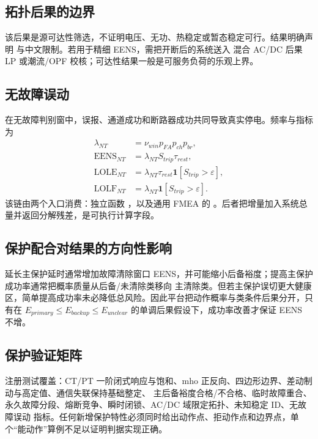 \subsection{拓扑后果的边界}
该后果是源可达性筛选，不证明电压、无功、热稳定或暂态稳定可行。结果明确声明
 与中文限制。若用于精细 EENS，需把开断后的系统送入
混合 AC/DC 后果 LP 或潮流/OPF 校核；可达性结果一般是可服务负荷的乐观上界。

\subsection{无故障误动}
在无故障判别窗中，误报、通道成功和断路器成功共同导致真实停电。频率与指标为
\begin{align}
 \lambda_{NT}&=\nu_{win}p_{FA}p_{ch}p_{br},\\
 \mathrm{EENS}_{NT}&=\lambda_{NT}S_{trip}\tau_{rest},\\
 \mathrm{LOLE}_{NT}&=\lambda_{NT}\tau_{rest}\mathbf1[S_{trip}>\varepsilon],\\
 \mathrm{LOLF}_{NT}&=\lambda_{NT}\mathbf1[S_{trip}>\varepsilon].
\end{align}
该链由两个入口消费：独立函数
，以及通用 FMEA 的
。后者把增量加入系统总量并返回分解残差，是可执行计算字段。

\subsection{保护配合对结果的方向性影响}
延长主保护延时通常增加故障清除窗口 EENS，并可能缩小后备裕度；提高主保护成功率通常把概率质量从后备/未清除类移向
主清除类。但若主保护误切更大健康区，简单提高成功率未必降低总风险。因此平台把动作概率与类条件后果分开，只有在
$E_{primary}\le E_{backup}\le E_{unclear}$ 的单调后果假设下，成功率改善才保证 EENS 不增。

\subsection{保护验证矩阵}
注册测试覆盖：CT/PT 一阶闭式响应与饱和、mho 正反向、四边形边界、差动制动与高定值、通信失联保持基础整定、
主后备裕度合格/不合格、临时故障重合、永久故障分段、熔断竞争、瞬时闭锁、AC/DC 域限定拓扑、未知稳定 ID、无故障误动
指标。任何新增保护特性必须同时给出动作点、拒动作点和边界点，单个“能动作”算例不足以证明判据实现正确。
